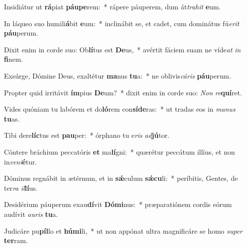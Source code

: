 \item Insidiátur ut \textbf{rá}piat \textbf{páu}\textbf{pe}rem:~* rápere páuperem, dum át\textit{tra}\textit{hit} \textbf{e}um.
\item In láqueo suo humili\textbf{á}bit \textbf{e}um:~* inclinábit se, et cadet, cum dominátus fú\textit{e}\textit{rit} \textbf{páu}perum.
\item Dixit enim in corde suo: Ob\textbf{lí}tus est \textbf{De}us,~* avértit fáciem suam ne víde\textit{at} \textit{in} \textbf{fi}nem.
\item Exsúrge, Dómine Deus, exaltétur \textbf{ma}nus \textbf{tu}a:~* ne oblivis\textit{cá}\textit{ris} \textbf{páu}perum.
\item Propter quid irritávit \textbf{ím}pius \textbf{De}um?~* dixit enim in corde suo: \textit{Non} \textit{re}\textbf{quí}ret.
\item Vides quóniam tu labórem et do\textbf{ló}rem con\textbf{sí}\textbf{de}ras:~* ut tradas eos in \textit{ma}\textit{nus} \textbf{tu}as.
\item Tibi dere\textbf{líc}tus est \textbf{pau}per:~* órphano tu e\textit{ris} \textit{ad}\textbf{jú}tor.
\item Cóntere bráchium peccatóris \textbf{et} ma\textbf{lí}gni:~* quærétur peccátum illíus, et non in\textit{ve}\textit{ni}\textbf{é}tur.
\item Dóminus regnábit in ætérnum, et in \textbf{sǽ}culum \textbf{sǽ}\textbf{cu}li:~* períbitis, Gentes, de ter\textit{ra} \textit{il}\textbf{lí}us.
\item Desidérium páuperum exau\textbf{dí}vit \textbf{Dó}\textbf{mi}nus:~* præparatiónem cordis eórum audívit \textit{au}\textit{ris} \textbf{tu}a.
\item Judicáre pu\textbf{píl}lo et \textbf{hú}\textbf{mi}li,~* ut non appónat ultra magnificáre se homo \textit{su}\textit{per} \textbf{ter}ram.
